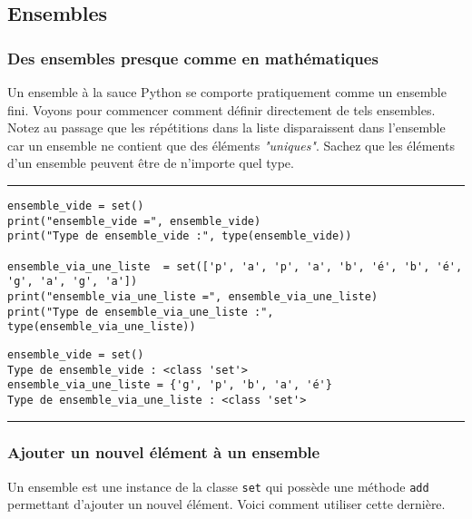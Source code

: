 \subsection{Ensembles}

\subsubsection{Des ensembles presque comme en mathématiques}

Un ensemble à la sauce Python se comporte pratiquement comme un ensemble fini. Voyons pour commencer comment définir directement de tels ensembles. Notez au passage que les répétitions dans la liste disparaissent dans l'ensemble car un ensemble ne contient que des éléments \textit{"uniques"}. Sachez que les éléments d'un ensemble peuvent être de n'importe quel type.


\bigskip
{\hrule height .5mm}
\begin{verbatim}
ensemble_vide = set()
print("ensemble_vide =", ensemble_vide)
print("Type de ensemble_vide :", type(ensemble_vide))

ensemble_via_une_liste  = set(['p', 'a', 'p', 'a', 'b', 'é', 'b', 'é', 'g', 'a', 'g', 'a'])
print("ensemble_via_une_liste =", ensemble_via_une_liste)
print("Type de ensemble_via_une_liste :", type(ensemble_via_une_liste))
\end{verbatim}
 \color{ForestGreen}
\vspace{-1.5em}
\begin{verbatim}
ensemble_vide = set()
Type de ensemble_vide : <class 'set'>
ensemble_via_une_liste = {'g', 'p', 'b', 'a', 'é'}
Type de ensemble_via_une_liste : <class 'set'>
\end{verbatim} \color{Black}
{\hrule height .5mm}
\bigskip


\subsubsection{Ajouter un nouvel élément à un ensemble}

Un ensemble est une instance de la classe \texttt{set} qui possède une méthode \texttt{add} permettant d'ajouter un nouvel élément. Voici comment utiliser cette dernière.


